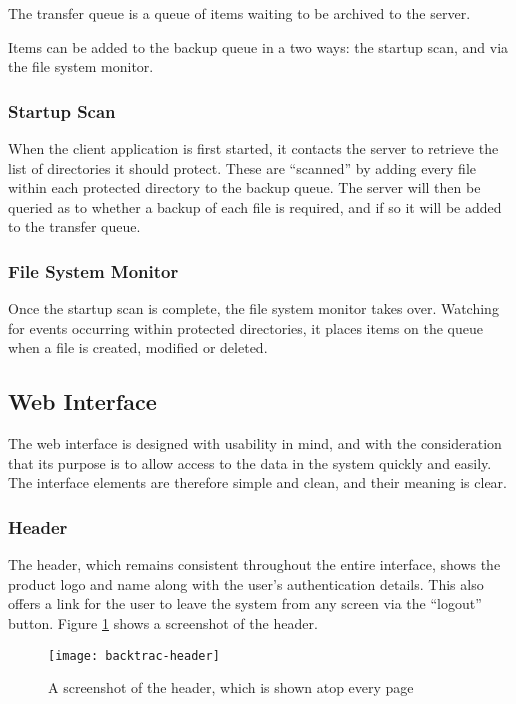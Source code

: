The transfer queue is a queue of items waiting to be archived to the server.

Items can be added to the backup queue in a two ways: the startup scan, and via
the file system monitor.

\subsubsection{Startup Scan}

When the client application is first started, it contacts the server to
retrieve the list of directories it should protect. These are ``scanned'' by
adding every file within each protected directory to the backup queue. The
server will then be queried as to whether a backup of each file is required,
and if so it will be added to the transfer queue.

\subsubsection{File System Monitor}

Once the startup scan is complete, the file system monitor takes over. Watching
for events occurring within protected directories, it places items on the queue
when a file is created, modified or deleted.

\subsection{Web Interface}

The web interface is designed with usability in mind, and with the
consideration that its purpose is to allow access to the data in the system
quickly and easily. The interface elements are therefore simple and clean, and
their meaning is clear.

\subsubsection{Header}

The header, which remains consistent throughout the entire interface, shows the
product logo and name along with the user's authentication details. This also
offers a link for the user to leave the system from any screen via the
``logout'' button. Figure \ref{fig:backtrac-header} shows a screenshot of the
header.

\begin{figure}
    \begin{center}
        \texttt{[image: backtrac-header]}
    \end{center}
    \caption{A screenshot of the header, which is shown atop every page}
    \label{fig:backtrac-header}
\end{figure}

